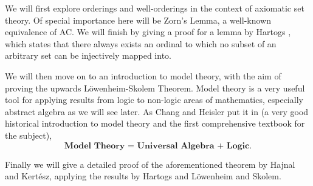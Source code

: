 \documentclass[../../main.tex]{subfiles}
\begin{document}
We will first explore orderings and well-orderings in the context of axiomatic set theory.
Of special importance here will be Zorn's Lemma, a well-known equivalence of AC.
We will finish by giving a proof for a lemma by Hartogs \cite{Har15}, which states that there always exists an ordinal to which no subset of an arbitrary set can be injectively mapped into.

We will then move on to an introduction to model theory, with the aim of proving the upwards Löwenheim-Skolem Theorem.
Model theory is a very useful tool for applying results from logic to non-logic areas of mathematics, especially abstract algebra as we will see later.
As Chang and Heisler put it in \cite{Cha90} (a very good historical introduction to model theory and the first comprehensive textbook for the subject), $$\textbf{Model Theory = Universal Algebra + Logic}.$$

Finally we will give a detailed proof of the aforementioned theorem by Hajnal and Kertész, applying the results by Hartogs and Löwenheim and Skolem.
\end{document}
